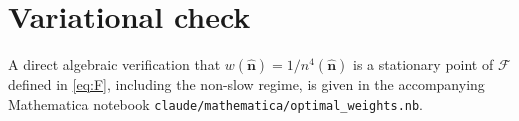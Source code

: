 \documentclass[11pt]{article}
\newcommand{\nv}{\hat{\boldsymbol{n}}}
\begin{document}
\appendix

\section{Variational check}\label{app:check}

A direct algebraic verification that $w(\nv)=1/n^4(\nv)$ is a stationary
point of $\mathcal F$ defined in \cref{eq:F}, including the non-slow regime,
is given in the accompanying Mathematica notebook
\texttt{claude/mathematica/optimal\_weights.nb}.
\end{document}
